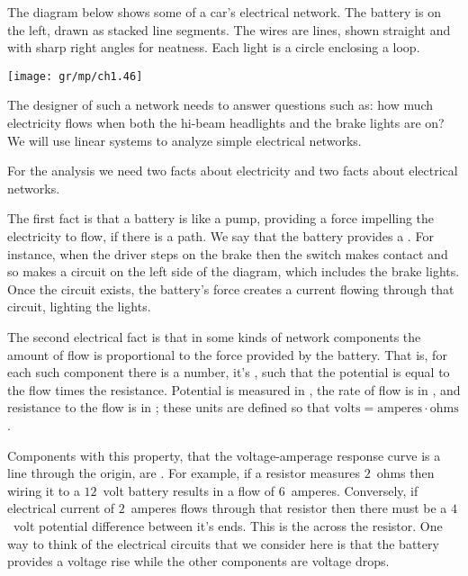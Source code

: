 The diagram below shows some of a car's electrical network.
The battery is on the left, drawn as stacked line segments. 
The wires are lines, shown straight and with sharp right angles
for neatness.
Each light is a circle enclosing a loop.
\begin{center}
  \texttt{[image: gr/mp/ch1.46]}
\end{center}
The designer of such a network needs to answer questions such as: 
how much electricity flows 
when both the hi-beam headlights and the brake lights are on?
We will use linear systems to analyze simple 
electrical networks. 

For the analysis we need two facts about electricity 
and two facts about electrical networks.

The first fact is that a battery is like a pump,  
providing a force impelling the electricity to flow, if there is a path.  
We say that the battery provides a 
.
For instance, when the driver steps on the brake then the switch makes contact
and so makes a circuit on the left side of the
diagram, which includes the brake lights. 
Once the circuit exists, the battery's force creates a
current flowing through that circuit, lighting the lights.

The second electrical fact is that in some 
kinds of network components
the amount of flow is proportional to the force provided by the battery.
That is, for each such component there is a number,  
it's ,
such that the potential is equal to the flow times the resistance.
Potential is measured in ,
the rate of flow is in ,
and resistance to the flow is in ;
these units are defined so that
$\mbox{volts}=\mbox{amperes}\cdot\mbox{ohms}$.

Components with this property,
that the voltage-amperage response curve is a line through the origin,
are .
For example, if a resistor measures $2$~ohms 
then wiring it to a $12$~volt battery 
results in a flow of $6$~amperes.
Conversely, if electrical current of
$2$~amperes flows through that resistor then there must be 
a $4$~volt potential difference between it's ends. 
This is the  across the 
resistor.
One way to think of the electrical circuits that we consider here
is that the battery provides a voltage rise while the other components 
are voltage drops.

